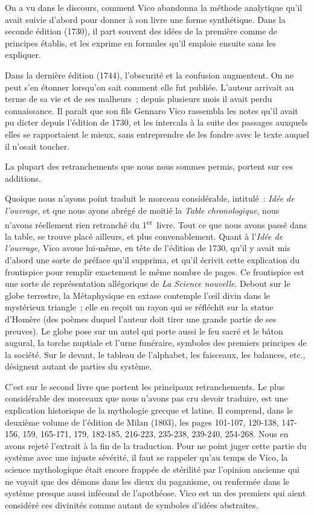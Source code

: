 \documentclass[french,twoside]{book} %
\begin{document}
On a vu dans le discours, comment Vico abandonna la méthode analytique qu’il avait suivie d’abord pour donner à son livre une forme synthétique. Dans la seconde édition (1730), il part souvent des idées de la première comme de principes établis, et les exprime en formules qu’il emploie ensuite sans les expliquer.\par
 Dans la dernière édition (1744), l’obscurité et la confusion augmentent. On ne peut s’en étonner lorsqu’on sait comment elle fut publiée. L’auteur arrivait au terme de sa vie et de ses malheurs ; depuis plusieurs mois il avait perdu connaissance. Il paraît que son fils Gennaro Vico rassembla les notes qu’il avait pu dicter depuis l’édition de 1730, et les intercala à la suite des passages auxquels elles se rapportaient le mieux, sans entreprendre de les fondre avec le texte auquel il n’osait toucher.\par
La plupart des retranchements que nous nous sommes permis, portent sur ces additions.\par
Quoique nous n’ayons point traduit le morceau considérable, intitulé : {\itshape Idée de l’ouvrage}, et que nous ayons abrégé de moitié la {\itshape Table chronologique}, nous n’avons réellement rien retranché du 1\textsuperscript{er} livre. Tout ce que nous avons passé dans la table, se trouve placé ailleurs, et plus convenablement. Quant à l’{\itshape Idée de l’ouvrage}, Vico avoue lui-même, en tête de l’édition de 1730, qu’il y avait mis d’abord une sorte de préface qu’il supprima, et qu’il écrivit cette explication du frontispice pour remplir exactement le même nombre de pages. Ce frontispice est une sorte de représentation allégorique de {\itshape La Science nouvelle}. Debout sur le globe terrestre, la Métaphysique en extase contemple l’œil divin dans le mystérieux triangle ; elle en reçoit un rayon qui se réfléchit sur la statue d’Homère (des poèmes duquel l’auteur doit tirer une grande partie de ses preuves). Le globe pose sur un autel qui porte aussi le feu sacré et le bâton augural, la torche nuptiale et l’urne funéraire, symboles des premiers principes de la société. Sur le devant, le tableau de l’alphabet, les faisceaux, les balances, etc., désignent autant de parties du système.\par
C’est sur le second livre que portent les principaux retranchements. Le plus considérable des morceaux que nous n’avons pas cru devoir traduire, est une explication historique de la mythologie grecque et latine. Il comprend, dans le deuxième volume de l’édition de Milan (1803), les pages 101-107, 120-138, 147-156, 159, 165-171, 179, 182-185, 216-223, 235-238, 239-240, 254-268. Nous en avons rejeté l’extrait à la fin de la traduction.  Pour ne point juger cette partie du système avec une injuste sévérité, il faut se rappeler qu’au temps de Vico, la science mythologique était encore frappée de stérilité par l’opinion ancienne qui ne voyait que des démons dans les dieux du paganisme, ou renfermée dans le système presque aussi infécond de l’apothéose. Vico est un des premiers qui aient considéré ces divinités comme autant de symboles d’idées abstraites.\par
\end{document}
